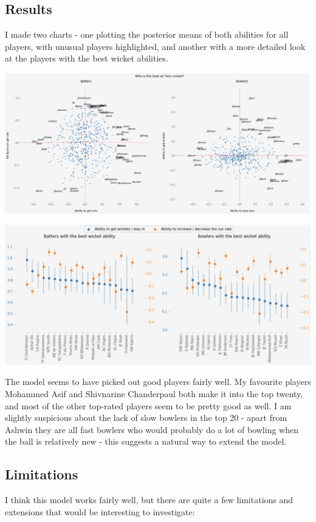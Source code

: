 \documentclass[11pt]{article}
\begin{document}
\subsection*{Results}
\label{sec:org258c64a}
I made two charts - one plotting the posterior means of both abilities
for all players, with unusual players highlighted, and another with a
more detailed look at the players with the best wicket abilities.
\begin{center}
\includegraphics[width=.9\linewidth]{images/cricket_radar.png}
\end{center}

\begin{center}
\includegraphics[width=.9\linewidth]{images/best_cricketers.png}
\end{center}

The model seems to have picked out good players fairly well. My
favourite players Mohammed Asif and Shivnarine Chanderpaul both make
it into the top twenty, and most of the other top-rated players seem
to be pretty good as well. I am slightly suspicious about the lack of
slow bowlers in the top 20 - apart from Ashwin they are all fast
bowlers who would probably do a lot of bowling when the ball is
relatively new - this suggests a natural way to extend the model.

\subsection*{Limitations}
\label{sec:org6047ce6}
I think this model works fairly well, but there are quite a few
limitations and extensions that would be interesting to investigate:
\end{document}
